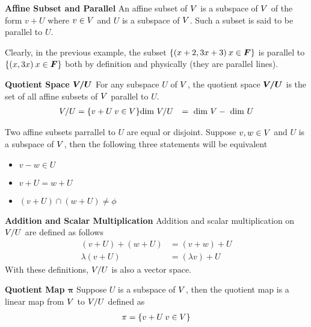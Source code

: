 \documentclass[../../linear_algebra.tex]{subfiles}
\begin{document}
\textbf{Affine Subset and Parallel}\newline
An affine subset of $V$ is a subspace of $V$ of the form $v + U$ where $v \in V$ and $U$ is a subspace of $V$. Such a subset is said to be parallel to $U$.\newline

Clearly, in the previous example, the subset $\{(x + 2, 3x + 3) \: x \in \bm{F} \}$ is parallel to $\{(x, 3x) \: x \in \bm{F} \}$ both by definition and physically (they are parallel lines).\newline

\textbf{Quotient Space $\bm{V/U}$}\newline
For any subspace $U$ of $V$, the quotient space $\bm{V/U}$ is the set of all affine subsets of $V$ parallel to $U$.
\begin{align*}
    V/U &= \{ v + U \: v \in V \}
    \text{dim } V/U &= \text{ dim } V - \text{ dim } U
\end{align*}

Two affine subsets parrallel to $U$ are equal or disjoint. Suppose $v, w \in V$ and $U$ is a subspace of $V$, then the following three statements will be equivalent
\begin{itemize}
    \item $v - w \in U$
    \item $v + U = w + U$
    \item $(v + U) \cap (w + U) \neq \phi$
\end{itemize}

\textbf{Addition and Scalar Multiplication}\nelwine
Addition and scalar multiplication on $V/U$ are defined as follows
\begin{align*}
    (v + U) + (w + U) &= (v + w) + U\\
    \lambda(v + U) &= (\lambda v) + U
\end{align*}
With these definitions, $V/U$ is also a vector space.\newline

\textbf{Quotient Map $\bm{\pi}$}
Suppose $U$ is a subspace of $V$, then the quotient map is a linear map from $V$ to $V/U$ defined as
\begin{align*}
    \pi = \{ v + U \: v \in V \}
\end{align*}
\end{document}
